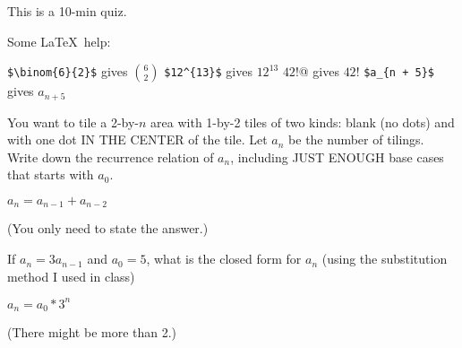 

\renewcommand\AUTHOR{nweadick1@cougars.ccis.edu} %


\topmattertwo

This is a 10-min quiz.

Some \LaTeX\ help:
\begin{enumerate}[nosep]
\li \verb!$\binom{6}{2}$! gives $\binom{6}{2}$
\li \verb!$12^{13}$! gives $12^{13}$
\li \verb@$42!$@ gives $42!$
\li \verb!$a_{n + 5}$! gives $a_{n + 5}$
\end{enumerate}

\nextq
You want to tile a 2-by-$n$ area with 1-by-2 tiles of two kinds: 
blank (no dots) and with one dot IN THE CENTER of the tile.
Let $a_n$ be the number of tilings.
Write down the recurrence relation of $a_n$, including JUST ENOUGH
base cases that starts with $a_0$.
\\
\ANSWER
\begin{answerlong}
$ a_n = a_{n-1} + a_{n-2} $
\end{answerlong}
(You only need to state the answer.)

\nextq
If $a_n = 3 a_{n-1}$ and $a_0 = 5$, what is the closed form for
$a_n$ (using the substitution method I used in class)
\\
\ANSWER
\begin{answerlong}
$a_n = a_0 * 3^n$
\end{answerlong}
(There might be more than 2.)

\newpage



